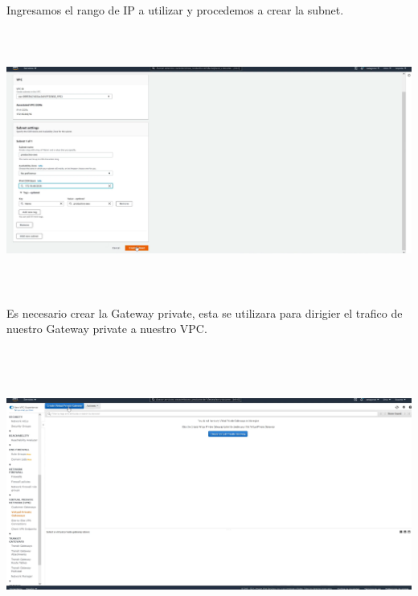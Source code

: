 \documentclass{article} %
\begin{document}
\noindent 

\noindent 

\noindent 

\noindent 

\noindent 

\noindent Ingresamos el  rango de IP a utilizar y procedemos a crear la subnet.  

\noindent 

\noindent 

\noindent \includegraphics*[width=5.67in, height=3.38in, trim=0.00in 0.00in 1.65in 0.00in]{image6}

\noindent 

\noindent 

\noindent Es necesario crear la Gateway private, esta se utilizara para dirigier el trafico de nuestro Gateway private a nuestro VPC.

\noindent 

\noindent \includegraphics*[width=6.06in, height=3.77in, trim=0.00in 2.43in 6.88in 0.00in]{image7}
\end{document}
